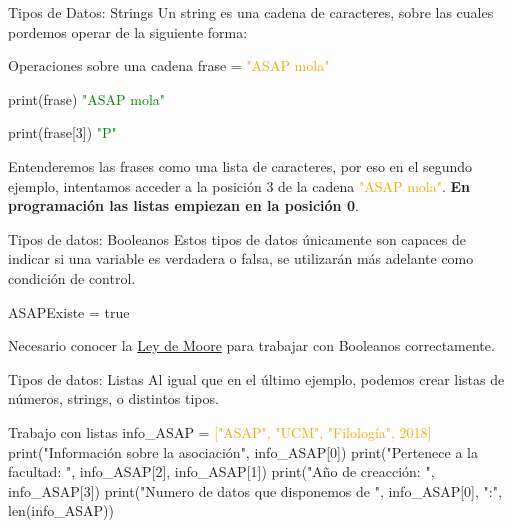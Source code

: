 \documentclass{beamer}
\begin{document}
    \begin{frame} {Tipos de Datos: Strings}
    \label{datos:strings}
    Un string es una cadena de caracteres, sobre las cuales pordemos operar de la siguiente forma:
    \begin{Programexample} {Operaciones sobre una cadena}
    	frase = \textcolor{orange}{"ASAP mola"}
    	
    	print(frase) \hspace{3cm} \textcolor{green}{"ASAP mola"}
    	
    	print(frase[3])\hspace{2.7cm} \textcolor{green}{"P"}
	\end{Programexample}

	Entenderemos las frases como una lista de caracteres, por eso en el segundo ejemplo, intentamos acceder a la posición 3 de la cadena  \textcolor{orange}{"ASAP mola"}.
	\textbf{En programación las listas empiezan en la posición 0}.
    \end{frame}
    \begin{frame}{Tipos de datos: Booleanos}
    \label{datos:bool}
    Estos tipos de datos únicamente son capaces de indicar si una variable es verdadera o falsa, se utilizarán más adelante como condición de control.
    
    \begin{Programexample}
    	\centering ASAPExiste = true
    \end{Programexample}

	Necesario conocer la \hyperlink{moorelaw}{Ley de Moore} para trabajar con Booleanos correctamente.
	\end{frame}
    \begin{frame}{Tipos de datos: Listas}
    \label{datos:listas}
    Al igual que en el último ejemplo, podemos crear listas de números, strings, o distintos tipos.
    
    \begin{Programexample}{Trabajo con listas}
    	info\_ASAP = \textcolor{orange}{["ASAP", "UCM", "Filología", 2018]}
    	\newline\newline
    	print("Información sobre la asociación",  info\_ASAP[0])\newline
    	print("Pertenece a la facultad: ", info\_ASAP[2], info\_ASAP[1]) \newline
    	print("Año de creacción: ", info\_ASAP[3])\newline
    	print("Numero de datos que disponemos de ", info\_ASAP[0], ":", len(info\_ASAP))
    \end{Programexample}
    \end{frame}
\end{document}
